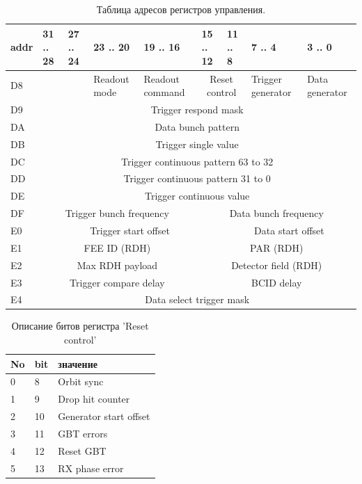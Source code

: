 \documentclass{article}
\begin{document}
\begin{table}[H]
\centering
\begin{tabular}{| l | l | l | l | l | l | l | l | l |}
\hline
addr & 31 .. 28 & 27 .. 24 & 23 .. 20 & 19 .. 16 & 15 .. 12 & 11 .. 8 & 7 .. 4 & 3 .. 0 \\ \hline
D8 &  &  & Readout mode & Readout command & \multicolumn{2}{c|}{Reset control} & Trigger generator & Data generator \\ \hline
D9 &  \multicolumn{8}{c|}{Trigger respond mask} \\\hline
DA &  \multicolumn{8}{c|}{Data bunch pattern} \\\hline
DB &  \multicolumn{8}{c|}{Trigger single value} \\\hline
DC &  \multicolumn{8}{c|}{Trigger continuous pattern 63 to 32} \\\hline
DD &  \multicolumn{8}{c|}{Trigger continuous pattern 31 to 0} \\\hline
DE &  \multicolumn{8}{c|}{Trigger continuous value} \\ \hline
DF &  \multicolumn{4}{c|}{Trigger bunch frequency} & \multicolumn{4}{c|}{Data bunch frequency} \\ \hline
E0 & & \multicolumn{3}{c|}{Trigger start offset} &  & \multicolumn{3}{c|}{Data start offset} \\ \hline
E1 &  \multicolumn{4}{c|}{FEE ID (RDH)} & \multicolumn{4}{c|}{PAR (RDH)} \\ \hline
E2 &  \multicolumn{4}{c|}{Max RDH payload} & \multicolumn{4}{c|}{Detector field (RDH)} \\ \hline
E3 &  \multicolumn{4}{c|}{Trigger compare delay} & \multicolumn{4}{c|}{BCID delay} \\ \hline
E4 &  \multicolumn{8}{c|}{Data select trigger mask} \\ \hline
\end{tabular}
\caption{Таблица адресов регистров управления.\label{tab2}}
\end{table}



\begin{table}[H]
\centering
\begin{tabular}{| l | l | l |}
\hline
No & bit & значение \\ \hline
0 & 8 & Orbit sync \\ \hline
1 & 9 & Drop hit counter \\ \hline
2 & 10 & Generator start offset \\ \hline
3 & 11 & GBT errors \\ \hline
4 & 12 & Reset GBT \\ \hline
5 & 13 & RX phase error \\ \hline
\end{tabular}
\caption{Описание битов регистра 'Reset control'\label{tab3}}
\end{table}
\end{document}
